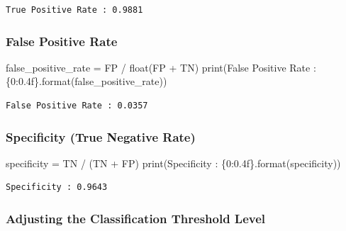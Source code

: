 \documentclass[
  letterpaper,
  DIV=11,
  numbers=noendperiod]{scrreprt}
\newenvironment{Shaded}{\begin{snugshade}}{\end{snugshade}}
\newcommand{\BuiltInTok}[1]{\textcolor[rgb]{0.00,0.23,0.31}{#1}}
\newcommand{\NormalTok}[1]{\textcolor[rgb]{0.00,0.23,0.31}{#1}}
\newcommand{\OperatorTok}[1]{\textcolor[rgb]{0.37,0.37,0.37}{#1}}
\newcommand{\SpecialCharTok}[1]{\textcolor[rgb]{0.37,0.37,0.37}{#1}}
\newcommand{\StringTok}[1]{\textcolor[rgb]{0.13,0.47,0.30}{#1}}
\begin{document}
\begin{verbatim}
True Positive Rate : 0.9881
\end{verbatim}

\subsubsection{False Positive Rate}\label{false-positive-rate}

\begin{Shaded}
\begin{Highlighting}[]
\NormalTok{false\_positive\_rate }\OperatorTok{=}\NormalTok{ FP }\OperatorTok{/} \BuiltInTok{float}\NormalTok{(FP }\OperatorTok{+}\NormalTok{ TN)}
\BuiltInTok{print}\NormalTok{(}\StringTok{\textquotesingle{}False Positive Rate : }\SpecialCharTok{\{0:0.4f\}}\StringTok{\textquotesingle{}}\NormalTok{.}\BuiltInTok{format}\NormalTok{(false\_positive\_rate))}
\end{Highlighting}
\end{Shaded}

\begin{verbatim}
False Positive Rate : 0.0357
\end{verbatim}

\subsubsection{Specificity (True Negative
Rate)}\label{specificity-true-negative-rate}

\begin{Shaded}
\begin{Highlighting}[]
\NormalTok{specificity }\OperatorTok{=}\NormalTok{ TN }\OperatorTok{/}\NormalTok{ (TN }\OperatorTok{+}\NormalTok{ FP)}
\BuiltInTok{print}\NormalTok{(}\StringTok{\textquotesingle{}Specificity : }\SpecialCharTok{\{0:0.4f\}}\StringTok{\textquotesingle{}}\NormalTok{.}\BuiltInTok{format}\NormalTok{(specificity))}
\end{Highlighting}
\end{Shaded}

\begin{verbatim}
Specificity : 0.9643
\end{verbatim}

\subsubsection{Adjusting the Classification Threshold
Level}\label{adjusting-the-classification-threshold-level}
\end{document}
